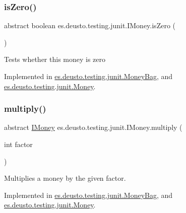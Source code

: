 \subsubsection{\texorpdfstring{is\+Zero()}{isZero()}}
{\footnotesize\ttfamily abstract boolean es.\+deusto.\+testing.\+junit.\+I\+Money.\+is\+Zero (\begin{DoxyParamCaption}{ }\end{DoxyParamCaption})\hspace{0.3cm}{\ttfamily [abstract]}}

Tests whether this money is zero 

Implemented in \hyperlink{classes_1_1deusto_1_1testing_1_1junit_1_1_money_bag_abebc5bc39c3343cb3c4e5fb291fd5893}{es.\+deusto.\+testing.\+junit.\+Money\+Bag}, and \hyperlink{classes_1_1deusto_1_1testing_1_1junit_1_1_money_a797658a03260b535e9a36ebbcc3b19c9}{es.\+deusto.\+testing.\+junit.\+Money}.

\mbox{\label{interfacees_1_1deusto_1_1testing_1_1junit_1_1_i_money_a09154f9713133d4734f72d6a20081209}} 
\subsubsection{\texorpdfstring{multiply()}{multiply()}}
{\footnotesize\ttfamily abstract \hyperlink{interfacees_1_1deusto_1_1testing_1_1junit_1_1_i_money}{I\+Money} es.\+deusto.\+testing.\+junit.\+I\+Money.\+multiply (\begin{DoxyParamCaption}\item[{int}]{factor }\end{DoxyParamCaption})\hspace{0.3cm}{\ttfamily [abstract]}}

Multiplies a money by the given factor. 

Implemented in \hyperlink{classes_1_1deusto_1_1testing_1_1junit_1_1_money_bag_aa20ce4cc70c2ba0bc9a5ccb96635d506}{es.\+deusto.\+testing.\+junit.\+Money\+Bag}, and \hyperlink{classes_1_1deusto_1_1testing_1_1junit_1_1_money_a02c7d4e9013710f70d1d46e9c9ebae88}{es.\+deusto.\+testing.\+junit.\+Money}.

\mbox{\label{interfacees_1_1deusto_1_1testing_1_1junit_1_1_i_money_a741967d7aa89055b6873619303b11385}} 
